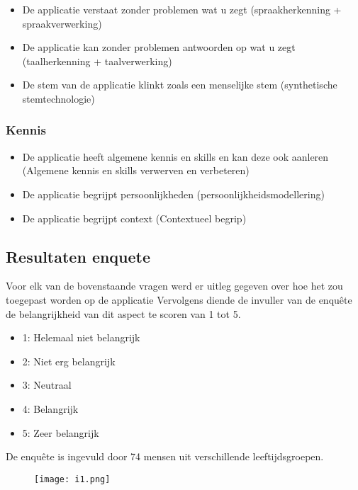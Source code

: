 \begin{itemize}
    \item De applicatie verstaat zonder problemen wat u zegt (spraakherkenning + spraakverwerking)
    \item De applicatie kan zonder problemen antwoorden op wat u zegt (taalherkenning + taalverwerking)
    \item De stem van de applicatie klinkt zoals een menselijke stem (synthetische stemtechnologie)
\end{itemize}

\subsubsection{Kennis}

\begin{itemize}
    \item De applicatie heeft algemene kennis en skills en kan deze ook aanleren (Algemene kennis en skills verwerven en verbeteren)
    \item De applicatie begrijpt persoonlijkheden (persoonlijkheidsmodellering)
    \item De applicatie begrijpt context (Contextueel begrip)
\end{itemize}

\newpage

\subsection{Resultaten enquete}

Voor elk van de bovenstaande vragen werd er uitleg gegeven over hoe het zou toegepast worden op de applicatie Vervolgens diende de invuller van de enquête de belangrijkheid van dit aspect te scoren van 1 tot 5.

\begin{itemize}
    \item 1: Helemaal niet belangrijk
    \item 2: Niet erg belangrijk
    \item 3: Neutraal
    \item 4: Belangrijk
    \item 5: Zeer belangrijk
\end{itemize}

De enquête is ingevuld door 74 mensen uit verschillende leeftijdsgroepen.

\begin{figure}[htbp]
    \centering
    \texttt{[image: i1.png]}
    \label{fig:leeftijdsgroepen_resultaat}
\end{figure}

